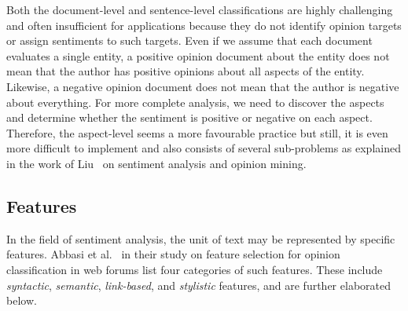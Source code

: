 Both the document-level and sentence-level classifications
are highly challenging and often insufficient for applications
because they do not identify opinion targets
or assign sentiments to such targets.
Even if we assume that each document evaluates a single entity,
a positive opinion document about the entity does not mean
that the author has positive opinions about all aspects of the entity.
Likewise, a negative opinion document does not mean
that the author is negative about everything.
For more complete analysis, we need to discover the aspects
and determine whether the sentiment is positive or negative on each aspect.
Therefore, the aspect-level seems a more favourable practice but still,
it is even more difficult to implement
and also consists of several sub-problems
as explained in the work of Liu~\cite{Liu12}
on sentiment analysis and opinion mining.

\subsection{Features}
\label{subsec:features}

In the field of sentiment analysis,
the unit of text may be represented by specific features.
Abbasi et al.~\cite{ACS08} in their study on feature selection
for opinion classification in web forums
list four categories of such features.
These include \emph{syntactic}, \emph{semantic}, \emph{link-based},
and \emph{stylistic} features,
and are further elaborated below.

